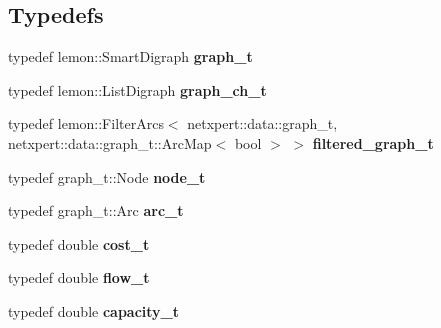 \subsection*{Typedefs}
\begin{DoxyCompactItemize}
\item 
typedef lemon\+::\+Smart\+Digraph {\bfseries graph\+\_\+t}\hypertarget{namespacenetxpert_1_1data_aa74c1b36e4f5f4fd195591738c30f39c}{}\label{namespacenetxpert_1_1data_aa74c1b36e4f5f4fd195591738c30f39c}

\item 
typedef lemon\+::\+List\+Digraph {\bfseries graph\+\_\+ch\+\_\+t}\hypertarget{namespacenetxpert_1_1data_a1087f975e9ca83a0027de2ba61d3958f}{}\label{namespacenetxpert_1_1data_a1087f975e9ca83a0027de2ba61d3958f}

\item 
typedef lemon\+::\+Filter\+Arcs$<$ netxpert\+::data\+::graph\+\_\+t, netxpert\+::data\+::graph\+\_\+t\+::\+Arc\+Map$<$ bool $>$ $>$ {\bfseries filtered\+\_\+graph\+\_\+t}\hypertarget{namespacenetxpert_1_1data_a8a616cc117257c9aa18f93a4d6ef1485}{}\label{namespacenetxpert_1_1data_a8a616cc117257c9aa18f93a4d6ef1485}

\item 
typedef graph\+\_\+t\+::\+Node {\bfseries node\+\_\+t}\hypertarget{namespacenetxpert_1_1data_a113013b587fbe23cbc530d01e33e98fe}{}\label{namespacenetxpert_1_1data_a113013b587fbe23cbc530d01e33e98fe}

\item 
typedef graph\+\_\+t\+::\+Arc {\bfseries arc\+\_\+t}\hypertarget{namespacenetxpert_1_1data_afda0f45b9f9fb9e9e363af1e4d8296b4}{}\label{namespacenetxpert_1_1data_afda0f45b9f9fb9e9e363af1e4d8296b4}

\item 
typedef double {\bfseries cost\+\_\+t}\hypertarget{namespacenetxpert_1_1data_ab85a54a37567ae71b3d92429a8fe80a9}{}\label{namespacenetxpert_1_1data_ab85a54a37567ae71b3d92429a8fe80a9}

\item 
typedef double {\bfseries flow\+\_\+t}\hypertarget{namespacenetxpert_1_1data_a77604d32c0b7a84e773566e7ad8a8638}{}\label{namespacenetxpert_1_1data_a77604d32c0b7a84e773566e7ad8a8638}

\item 
typedef double {\bfseries capacity\+\_\+t}\hypertarget{namespacenetxpert_1_1data_a05ecea9f371a72b3f2284c54337792fd}{}\label{namespacenetxpert_1_1data_a05ecea9f371a72b3f2284c54337792fd}


\end{DoxyCompactItemize}
